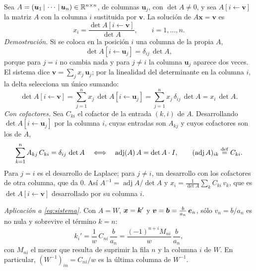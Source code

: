 \begin{idea}
Sea $A=(\bm u_1\,|\,\cdots\,|\,\bm u_n)\in\mathbb{R}^{n\times n}$, de columnas
$\bm u_j$, con $\det A\neq0$, y sea $A[i\leftarrow\bm v]$ la matriz $A$ con
la columna $i$ sustituida por $\bm v$. La solución de $A\bm x=\bm v$ es
\[
  x_i=\frac{\det A[i\leftarrow\bm v]}{\det A},\qquad i=1,\dots,n .
\]
\emph{Demostración.} Si se coloca en la posición $i$ una columna de la
propia $A$,
\[
  \det A[i\leftarrow\bm u_j]=\delta_{ij}\,\det A ,
\]
porque para $j=i$ no cambia nada y para $j\neq i$ la columna $\bm u_j$
aparece dos veces. El sistema dice $\bm v=\sum_jx_j\,\bm u_j$; por la
linealidad del determinante en la columna $i$, la delta selecciona un único
sumando:
\[
  \det A[i\leftarrow\bm v]=\sum_{j=1}^{n}x_j\,\det A[i\leftarrow\bm u_j]
  =\sum_{j=1}^{n}x_j\,\delta_{ij}\,\det A=x_i\,\det A .
\]
\emph{Con cofactores.} Sea $C_{ki}$ el cofactor de la entrada $(k,i)$ de $A$.
Desarrollando $\det A[i\leftarrow\bm u_j]$ por la columna $i$, cuyas
entradas son $A_{kj}$ y cuyos cofactores son los de $A$,
\[
  \sum_{k=1}^{n}A_{kj}\,C_{ki}=\delta_{ij}\,\det A
  \quad\Longleftrightarrow\quad
  \operatorname{adj}(A)\,A=\det A\cdot I,\qquad (\operatorname{adj}A)_{ik}\mathrel{\overset{\mathrm{def}}{=}} C_{ki}.
\]
Para $j=i$ es el desarrollo de Laplace; para $j\neq i$, un desarrollo con
los cofactores de otra columna, que da $0$. Así
$A^{-1}=\operatorname{adj}A/\det A$ y
$x_i=\frac{1}{\det A}\sum_kC_{ki}\,v_k$, que es $\det A[i\leftarrow\bm v]$
desarrollado por su columna $i$.

\emph{Aplicación a \eqref{eq:sistema}.} Con $A=W$, $\bm x=\bm{k}'$ y
$\bm v=\bm{b}=\frac{b}{a_n}\,\bm{e}_n$, sólo $v_n=b/a_n$ es no nula y sobrevive el
término $k=n$:
\[
  k_i'=\frac{1}{w}\,C_{ni}\,\frac{b}{a_n}
  =\frac{(-1)^{n+i}M_{ni}}{w}\,\frac{b}{a_n},
\]
con $M_{ni}$ el menor que resulta de suprimir la fila $n$ y la columna $i$
de $W$. En particular, $(W^{-1})_{in}=C_{ni}/w$ es la última columna de
$W^{-1}$.
\end{idea}

